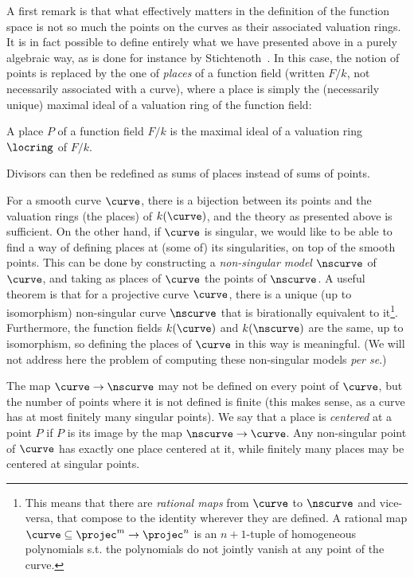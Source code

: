 A first remark is that what effectively matters in the definition of the function space is not so much the points on the curves as their associated valuation
rings. It is in fact possible to define entirely what we have presented above in a purely algebraic way, as is done for instance by Stichtenoth~\cite{stichtenoth}.
In this case, the notion of points is replaced by the one of \emph{places} of a function field (written $F/k$, not necessarily associated with a curve), where a place is simply the (necessarily unique) maximal
ideal of a valuation ring of the function field:

\begin{defi}
A place $P$ of a function field $F/k$ is the maximal ideal of a valuation ring $\locring$ of $F/k$. 
\end{defi}

Divisors can then be redefined as sums of places instead of sums of points.

For a smooth curve $\curve$, there is a bijection between its points and the valuation rings (the places) of $k(\curve)$, and the theory as presented above is sufficient.
On the other hand, if $\curve$ is singular, we would like to be able to find a way of defining places at (some of) its singularities, on top of the smooth points.
This can be done by constructing a \emph{non-singular model} $\nscurve$ of $\curve$,
and taking as places of $\curve$ the points of $\nscurve$. A useful theorem is that for a projective curve $\curve$, there is a unique (up to isomorphism) non-singular curve
$\nscurve$ that is birationally equivalent to it\footnote{This means that there are \emph{rational maps} from $\curve$ to $\nscurve$ and vice-versa, that compose to the identity wherever they are
defined.
A rational map $\curve \subseteq \projec^m \rightarrow \projec^n$ is an $n+1$-tuple of homogeneous polynomials s.t. the polynomials do not jointly
vanish at any point of the curve.}. Furthermore, the function fields $k(\curve)$ and $k(\nscurve)$ are the same, up to isomorphism, so defining the places of $\curve$ in this
way is meaningful.
(We will not address here the problem of computing these non-singular models \emph{per se}.)

The map $\curve \rightarrow \nscurve$ may not be defined on every point of $\curve$, but the number of points where it is not defined is finite (this makes sense, as a curve
has at most finitely many singular points). We say that a place is \emph{centered} at a point $P$ if $P$ is its image by the map $\nscurve \rightarrow \curve$. Any non-singular
point of $\curve$ has exactly one place centered at it, while finitely many places may be centered at singular points.

